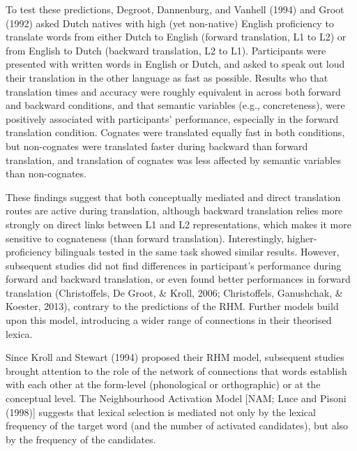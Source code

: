 \documentclass[
  english,
  man,floatsintext]{apa6}
\begin{document}
To test these predictions, Degroot, Dannenburg, and Vanhell (1994) and Groot (1992) asked Dutch natives with high (yet non-native) English proficiency to translate words from either Dutch to English (forward translation, L1 to L2) or from English to Dutch (backward translation, L2 to L1). Participants were presented with written words in English or Dutch, and asked to speak out loud their translation in the other language as fast as possible. Results who that translation times and accuracy were roughly equivalent in across both forward and backward conditions, and that semantic variables (e.g., concreteness), were positively associated with participants' performance, especially in the forward translation condition. Cognates were translated equally fast in both conditions, but non-cognates were translated faster during backward than forward translation, and translation of cognates was less affected by semantic variables than non-cognates.

These findings suggest that both conceptually mediated and direct translation routes are active during translation, although backward translation relies more strongly on direct links between L1 and L2 representations, which makes it more sensitive to cognateness (than forward translation). Interestingly, higher-proficiency bilinguals tested in the same task showed similar results. However, subsequent studies did not find differences in participant's performance during forward and backward translation, or even found better performances in forward translation (Christoffels, De Groot, \& Kroll, 2006; Christoffels, Ganushchak, \& Koester, 2013), contrary to the predictions of the RHM. Further models build upon this model, introducing a wider range of connections in their theorised lexica.

Since Kroll and Stewart (1994) proposed their RHM model, subsequent studies brought attention to the role of the network of connections that words establish with each other at the form-level (phonological or orthographic) or at the conceptual level. The Neighbourhood Activation Model {[}NAM; Luce and Pisoni (1998){]} suggests that lexical selection is mediated not only by the lexical frequency of the target word (and the number of activated candidates), but also by the frequency of the candidates.
\end{document}
